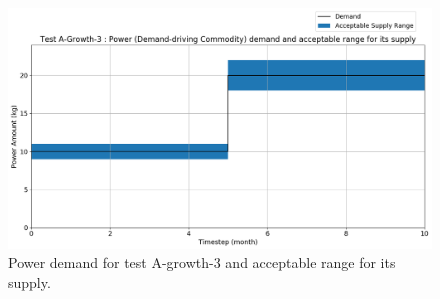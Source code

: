 \documentclass[11pt,letterpaper]{article}
\begin{document}
\begin{figure}[H]
	\begin{center}
		\includegraphics[scale=0.4]{./figures/Power_A-Growth-3_demand_supply.png}
	\end{center}
        \caption{Power demand for test A-growth-3 and acceptable range for its supply.}
	\label{fig:test-a-growth-3-demand}
\end{figure}
\end{document}
